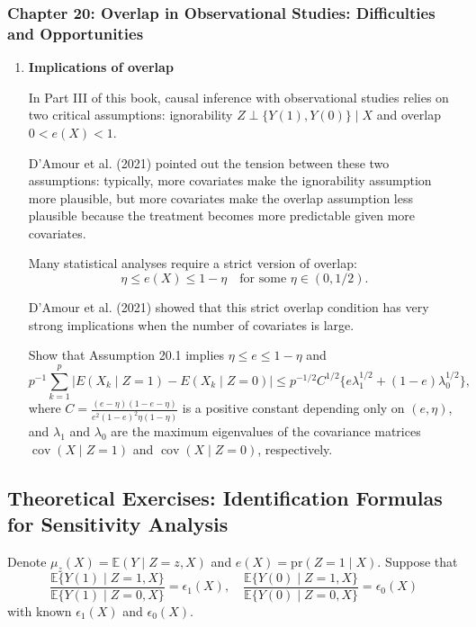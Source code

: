\documentclass[11pt]{article}
\begin{document}
\subsubsection*{Chapter 20: Overlap in Observational Studies: Difficulties and Opportunities}

\begin{enumerate}[label=\textbf{20.\arabic*}]

\item[\textbf{20.1}] \textbf{Implications of overlap}

In Part III of this book, causal inference with observational studies relies on two critical assumptions: ignorability $Z \perp \{Y(1), Y(0)\} \mid X$ and overlap $0 < e(X) < 1$.

D'Amour et al. (2021) pointed out the tension between these two assumptions: typically, more covariates make the ignorability assumption more plausible, but more covariates make the overlap assumption less plausible because the treatment becomes more predictable given more covariates.

Many statistical analyses require a strict version of overlap:
\[
\eta \leq e(X) \leq 1 - \eta \quad \text{for some } \eta \in (0, 1/2).
\]

D'Amour et al. (2021) showed that this strict overlap condition has very strong implications when the number of covariates is large.

Show that Assumption 20.1 implies $\eta \leq e \leq 1 - \eta$ and
\[
p^{-1} \sum_{k=1}^{p} \left| E(X_k \mid Z = 1) - E(X_k \mid Z = 0) \right| \leq p^{-1/2} C^{1/2} \{e \lambda_1^{1/2} + (1 - e) \lambda_0^{1/2}\},
\]
where $C = \frac{(e - \eta)(1 - e - \eta)}{e^2 (1 - e)^2 \eta (1 - \eta)}$ is a positive constant depending only on $(e, \eta)$, and $\lambda_1$ and $\lambda_0$ are the maximum eigenvalues of the covariance matrices $\operatorname{cov}(X \mid Z = 1)$ and $\operatorname{cov}(X \mid Z = 0)$, respectively.

\end{enumerate}

\subsection*{Theoretical Exercises: Identification Formulas for Sensitivity Analysis}

Denote $\mu_z(X) = \mathbb{E}(Y \mid Z = z, X)$ and $e(X) = \mathrm{pr}(Z = 1 \mid X)$.
Suppose that
\[
\frac{\mathbb{E}\{Y(1) \mid Z = 1, X\}}{\mathbb{E}\{Y(1) \mid Z = 0, X\}} = \epsilon_1(X), \quad
\frac{\mathbb{E}\{Y(0) \mid Z = 1, X\}}{\mathbb{E}\{Y(0) \mid Z = 0, X\}} = \epsilon_0(X)
\]
with known $\epsilon_1(X)$ and $\epsilon_0(X)$.
\end{document}
